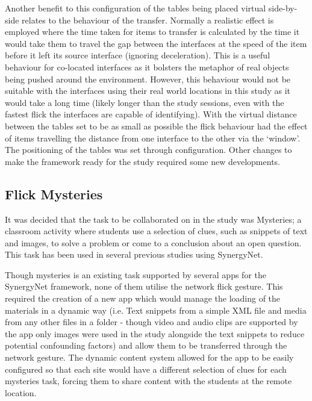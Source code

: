 \documentclass[a4paper,11pt]{article}
\begin{document}
Another benefit to this configuration of the tables being placed virtual side-by-side relates to the behaviour of the transfer.
Normally a realistic effect is employed where the time taken for items to transfer is calculated by the time it would take them to travel the gap between the interfaces at the speed of the item before it left its source interface (ignoring deceleration).
This is a useful behaviour for co-located interfaces as it bolsters the metaphor of real objects being pushed around the environment.
However, this behaviour would not be suitable with the interfaces using their real world locations in this study as it would take a long time (likely longer than the study sessions, even with the fastest flick the interfaces are capable of identifying).
With the virtual distance between the tables set to be as small as possible the flick behaviour had the effect of items travelling the distance from one interface to the other via the `window'.
The positioning of the tables was set through configuration.
Other changes to make the framework ready for the study required some new developments.

\subsection{Flick Mysteries}

It was decided that the task to be collaborated on in the study was Mysteries; a classroom activity where students use a selection of clues, such as snippets of text and images, to solve a problem or come to a conclusion about an open question.
This task has been used in several previous studies using SynergyNet. %


Though mysteries is an existing task supported by several apps for the SynergyNet framework, none of them utilise the network flick gesture.
This required the creation of a new app which would manage the loading of the materials in a dynamic way (i.e.
Text snippets from a simple XML file and media from any other files in a folder - though video and audio clips are supported by the app only images were used in the study alongside the text snippets to reduce potential confounding factors) and allow them to be transferred through the network gesture.
The dynamic content system allowed for the app to be easily configured so that each site would have a different selection of clues for each mysteries task, forcing them to share content with the students at the remote location.
\end{document}
